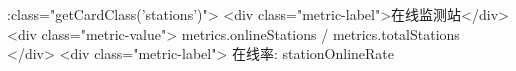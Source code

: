 :class="getCardClass('stations')"> <div class="metric-label">在线监测站</div> <div class="metric-value">{{ metrics.onlineStations }} / {{ metrics.totalStations }}</div> <div class="metric-label"> 在线率: {{ stationOnlineRate }}%